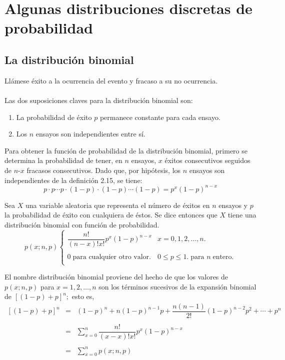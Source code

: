 \chapter{Algunas distribuciones discretas de probabilidad}


\setcounter{section}{1}
\section{La distribución binomial}
Llámese éxito a la ocurrencia del evento y fracaso a su no ocurrencia.\\\\
Las dos suposiciones claves para la distribución binomial son:
\begin{enumerate}
    \item La probabilidad de éxito $p$ permanece constante para cada ensayo.
    \item Los $n$ ensayos son independientes entre sí.
\end{enumerate}

Para obtener la función de probabilidad de la distribución binomial, primero se determina la probabilidad de tener, en $n$ ensayos, $x$ éxitos consecutivos seguidos de $n$-$x$ fracasos consecutivos. Dado que, por hipótesis, los $n$ ensayos son independientes de la definición 2.15, se tiene:
$$p\cdot p\cdots p \cdot (1-p)\cdot (1-p)\cdots (1-p) = p^x(1-p)^{n-x}$$

\begin{tcolorbox}[colback = white]
    \begin{def.}
	Sea $X$ una variable aleatoria que representa el número de éxitos en $n$ ensayos y $p$ la probabilidad de éxito con cualquiera de éstos. Se dice entonces que $X$ tiene una distribución binomial con función de probabilidad.
	$$p(x;n,p)\left\{\begin{array}{ll}
	    \dfrac{n!}{(n-x)!x!} p^x(1-p)^{n-x} & x = 0,1,2,\ldots,n.\\\\
	    0\; \mbox{para cualquier otro valor.} & 0\leq p \leq 1. \; \mbox{para } n \;\mbox{entero}.\\
	\end{array}\right.$$
     \end{def.}
\end{tcolorbox}

El nombre distribución binomial proviene del hecho de que los valores de $p(x;n,p)$ para $x=1,2,\ldots,n$ son los términos sucesivos de la expansión binomial de $[(1-p)+p]^n;$ esto es,
$$\begin{array}{rcl}
    [(1-p)+p]^n & = & (1-p)^n + n(1-p)^{n-1} p + \dfrac{n(n-1)}{2!} (1-p)^{n-2}p^2 + \cdots + p^n\\\\
		& = & \sum\limits_{x=0}^n \dfrac{n!}{(x-x)!x!} p^x(1-p)^{n-x}\\\\
		& = & \sum\limits_{x=0}^n p(x;n,p)\\\\
\end{array}$$

